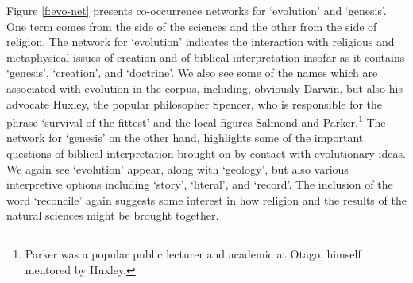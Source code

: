 \documentclass{article}
\begin{document}
Figure \ref{f:evo-net} presents co-occurrence networks for `evolution' and `genesis'. One term comes from the side of the sciences and the other from the side of religion. The network for `evolution' indicates the interaction with religious and metaphysical issues of creation and of biblical interpretation insofar as it contains `genesis', `creation', and `doctrine'. We also see some of the names which are associated with evolution in the corpus, including, obviously Darwin, but also his advocate Huxley, the popular philosopher Spencer, who is responsible for the phrase `survival of the fittest' and the local figures Salmond and Parker.\footnote{Parker was a popular public lecturer and academic at Otago, himself mentored by Huxley.} %
The network for `genesis' on the other hand, highlights some of the important questions of biblical interpretation brought on by contact with evolutionary ideas. We again see `evolution' appear, along with `geology', but also various interpretive options including `story', `literal', and `record'. The inclusion of the word `reconcile' again suggests some interest in how religion and the results of the natural sciences might be brought together.
\end{document}
